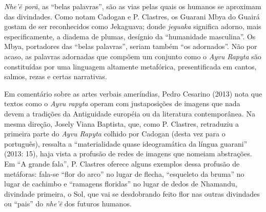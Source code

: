 {{\emph{Nhe’ẽ porã}, as ``belas palavras'', são as vias pelas quais os
humanos se aproximam das divindades. Como notam Cadogan e P. Clastres,
os Guarani Mbya do Guairá gostam de ser reconhecidos como Jekaguava;
donde \emph{jeguaka} significa adorno, mais especificamente, a diadema de
plumas, desígnio da ``humanidade masculina''. Os Mbya, portadores das
``belas palavras'', seriam também ``os adornados''. Não por acaso, as
palavras adornadas que compõem um conjunto como o \emph{Ayvu Rapyta} são
constituídas por uma linguagem altamente metafórica, presentificada em
cantos, salmos, rezas e certas narrativas.

Em comentário sobre as artes verbais ameríndias, Pedro Cesarino (2013)
nota que textos como o \emph{Ayvu rapyta} operam com justaposições de imagens
que nada devem a tradições da Antiguidade européia ou da literatura
contemporânea. Na mesma direção, Josely Viana Baptista, que, como P.
Clastres, retraduziu a primeira parte do \emph{Ayvu Rapyta} colhido por
Cadogan (desta vez para o português), ressalta a ``materialidade quase
ideogramática da língua guarani'' (2013: 15), haja vista a profusão de
redes de imagens que nomeiam abstrações. Em ``A grande fala'', P. Clastres
oferece alguns exemplos dessa profusão de metáforas: fala-se ``flor do
arco'' no lugar de flecha, ``esqueleto da bruma'' no lugar de cachimbo e
``ramagens floridas'' no lugar de dedos de Nhamandu, divindade primeira,
o Sol, que vai se desdobrando feito flor nas outras divindades ou
``pais'' do \emph{nhe’ẽ} dos futuros humanos.

}}
